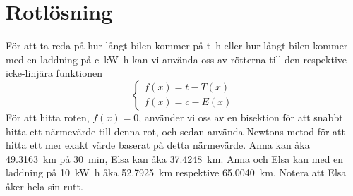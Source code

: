 \documentclass[]{scrreprt}
\begin{document}
\section{Rotlösning}
För att ta reda på hur långt bilen kommer på \SI[number-math-rm = \mathnormal,parse-numbers=false]{t}{\hour}
eller hur långt bilen kommer med en laddning på \SI[number-math-rm = \mathnormal,parse-numbers=false]{c}{\kilo\watt\hour}
kan vi använda oss av rötterna till den respektive icke-linjära funktionen
\[
\begin{cases}
f(x) = t - T(x)\\
f(x) = c - E(x)
\end{cases}
\]
För att hitta roten, \(f(x) = 0\), använder vi oss av en bisektion för att snabbt hitta ett närmevärde till denna rot, och sedan använda Newtons metod för att hitta ett mer exakt värde baserat på detta närmevärde.
Anna kan åka \SI{49.3163}{\kilo\meter} på \SI{30}{\minute}, Elsa kan åka \SI{37.4248}{\kilo\meter}.
Anna och Elsa kan med en laddning på \SI{10}{\kilo\watt\hour} åka \SI{52.7925}{\kilo\meter} respektive \SI{65.0040}{\kilo\meter}. Notera att Elsa åker hela sin rutt.
\renewcommand{\appendixpagename}{Appendix}
\renewcommand{\appendixtocname}{Appendix}
\printbibliography
\end{document}
